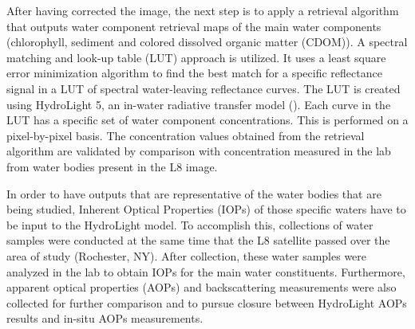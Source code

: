 After having corrected the image, the next step is to apply a retrieval algorithm that outputs water component retrieval maps of the main water components (chlorophyll, { sediment} and colored dissolved organic matter (CDOM)). A spectral matching and look-up table (LUT) approach is utilized. It uses a least square error minimization algorithm to find the best match for a specific reflectance signal in a LUT of spectral water-leaving reflectance curves. The LUT is created using HydroLight 5, an in-water radiative transfer model (\cite{Mobley:2005}). Each curve in the LUT has a specific set of water component concentrations. This is performed on a pixel-by-pixel basis. The concentration values obtained from the retrieval algorithm are validated by comparison with concentration measured in the lab from water bodies present in the L8 image.

In order to have outputs that are representative of the water bodies that are being studied, Inherent Optical Properties (IOPs) of those specific waters have to be input to the HydroLight model. To accomplish this, collections of water samples were conducted at the same time that the L8 satellite passed over the area of study (Rochester, NY). After collection, these water samples were analyzed in the lab to obtain IOPs for the main water constituents. Furthermore, apparent optical properties (AOPs) and backscattering measurements were also collected for further comparison and to pursue closure between HydroLight AOPs results and in-situ AOPs measurements.

